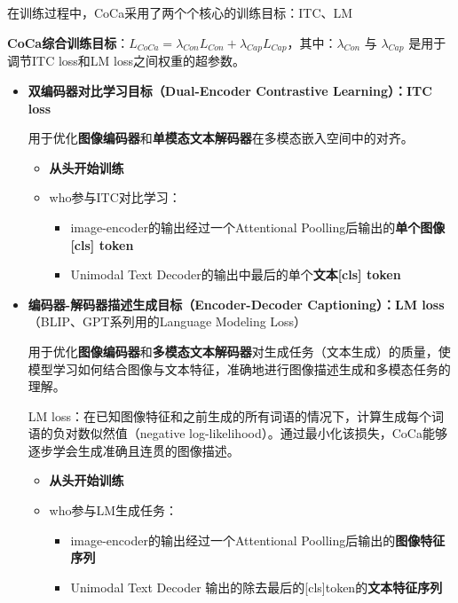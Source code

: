 \documentclass[zihao=false,fontset=windows]{ctexart}
\begin{document}
\par\vspace{1.15em}\par\vspace{0.28em}
在训练过程中，CoCa采用了两个个核心的训练目标：ITC、LM\par
\textcolor{feishuRed}{\textbf{CoCa综合训练目标}}：$L_{CoCa}=\lambda_{Con}L_{Con}+\lambda_{Cap}L_{Cap}$，其中：$\lambda_{Con}$ 与 $\lambda_{Cap}$ 是用于调节ITC loss和LM loss之间权重的超参数。\par

\begin{itemize}
\item \textbf{双编码器对比学习目标（Dual-Encoder Contrastive Learning）：}\textcolor{feishuRed}{\textbf{ITC loss}}\par
\textcolor{feishuGreen}{用于优化\textbf{图像编码器}和\textbf{单模态文本解码器}在多模态嵌入空间中的对齐。}
\begin{itemize}
\item \textcolor{feishuRed}{\textbf{从头开始训练}}
\item who参与ITC对比学习：
\begin{itemize}
\item image-encoder的输出经过一个Attentional Poolling后输出的\textcolor{feishuBlue}{\textbf{单个图像[cls] token}}
\item Unimodal Text Decoder的输出中最后的单个\textcolor{feishuBlue}{\textbf{文本[cls] token}}
\end{itemize}
\end{itemize}

\item \textbf{编码器-解码器描述生成目标（Encoder-Decoder Captioning）：}\textcolor{feishuRed}{\textbf{LM loss}}（BLIP、GPT系列用的Language Modeling Loss）\par
\textcolor{feishuGreen}{用于优化\textbf{图像编码器}和\textbf{多模态文本解码器}对生成任务（文本生成）的质量，使模型学习如何结合图像与文本特征，准确地进行图像描述生成和多模态任务的理解。}\par
LM loss：在已知图像特征和之前生成的所有词语的情况下，计算生成每个词语的负对数似然值（negative log-likelihood）。通过最小化该损失，CoCa能够逐步学会生成准确且连贯的图像描述。
\begin{itemize}
\item \textcolor{feishuRed}{\textbf{从头开始训练}}
\item who参与LM生成任务：
\begin{itemize}
\item image-encoder的输出经过一个Attentional Poolling后输出的\textcolor{feishuBlue}{\textbf{图像特征序列}}
\item Unimodal Text Decoder 输出的除去最后的[cls]token的\textcolor{feishuBlue}{\textbf{文本特征序列}}
\end{itemize}
\end{itemize}
\end{itemize}
\end{document}
